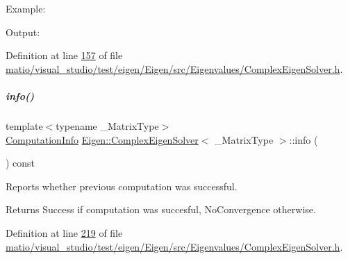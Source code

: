 Example\+: 
\begin{DoxyCodeInclude}
\end{DoxyCodeInclude}
 Output\+: 
\begin{DoxyVerbInclude}
\end{DoxyVerbInclude}
 

Definition at line \hyperlink{matio_2visual__studio_2test_2eigen_2_eigen_2src_2_eigenvalues_2_complex_eigen_solver_8h_source_l00157}{157} of file \hyperlink{matio_2visual__studio_2test_2eigen_2_eigen_2src_2_eigenvalues_2_complex_eigen_solver_8h_source}{matio/visual\+\_\+studio/test/eigen/\+Eigen/src/\+Eigenvalues/\+Complex\+Eigen\+Solver.\+h}.

\mbox{\label{group___eigenvalues___module_ad4d9d8b90145900b9686d2dabbe46730}} 
\subparagraph{\texorpdfstring{info()}{info()}\hspace{0.1cm}{\footnotesize\ttfamily [1/2]}}
{\footnotesize\ttfamily template$<$typename \+\_\+\+Matrix\+Type$>$ \\
\hyperlink{group__enums_ga85fad7b87587764e5cf6b513a9e0ee5e}{Computation\+Info} \hyperlink{group___eigenvalues___module_class_eigen_1_1_complex_eigen_solver}{Eigen\+::\+Complex\+Eigen\+Solver}$<$ \+\_\+\+Matrix\+Type $>$\+::info (\begin{DoxyParamCaption}{ }\end{DoxyParamCaption}) const\hspace{0.3cm}{\ttfamily [inline]}}



Reports whether previous computation was successful. 

\begin{DoxyReturn}{Returns}
{\ttfamily Success} if computation was succesful, {\ttfamily No\+Convergence} otherwise. 
\end{DoxyReturn}


Definition at line \hyperlink{matio_2visual__studio_2test_2eigen_2_eigen_2src_2_eigenvalues_2_complex_eigen_solver_8h_source_l00219}{219} of file \hyperlink{matio_2visual__studio_2test_2eigen_2_eigen_2src_2_eigenvalues_2_complex_eigen_solver_8h_source}{matio/visual\+\_\+studio/test/eigen/\+Eigen/src/\+Eigenvalues/\+Complex\+Eigen\+Solver.\+h}.

